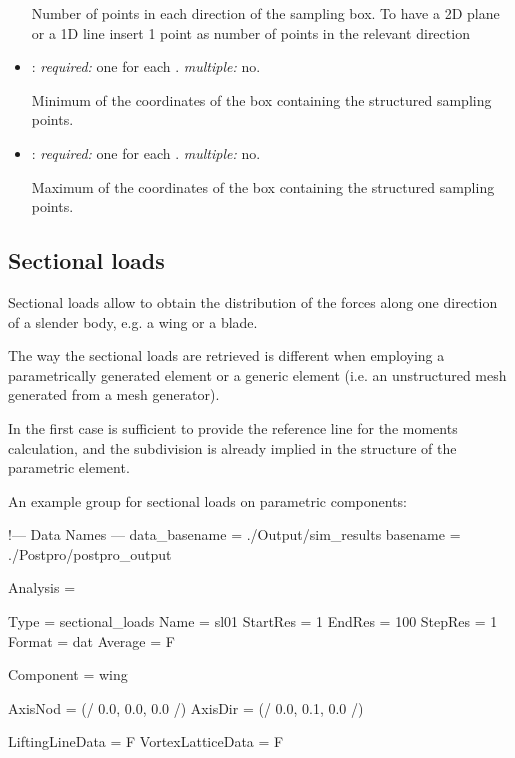 \begin{itemize}
Number of points in each direction of the sampling box. To have a 2D plane or a 1D line insert 1 point as number of points in the relevant direction

\item {}: \textit{required:} one for each . \textit{multiple:} no.

Minimum of the coordinates of the box containing the structured sampling points.

\item {}: \textit{required:} one for each . \textit{multiple:} no.

Maximum of the coordinates of the box containing the structured sampling points.

\end{itemize}

\subsection{Sectional loads}

Sectional loads allow to obtain the distribution of the forces along one direction of a slender body, e.g. a wing or a blade. 

The way the sectional loads are retrieved is different when employing a parametrically generated element or a generic element (i.e. an unstructured mesh generated from a mesh generator). 

In the first case is sufficient to provide the reference line for the moments calculation, and the subdivision is already implied in the structure of the parametric element. 

An example  group for sectional loads on parametric components:

\begin{inputfile}[frame=single, caption={dust\_post.in for sectional load on parametric components}, label={file:dust_post.in_sectional_param}]
!--- Data Names ---
data_basename = ./Output/sim_results
basename =     ./Postpro/postpro_output

Analysis = {

Type = sectional_loads
Name = sl01
StartRes = 1
EndRes   = 100 
StepRes  = 1
Format = dat
Average = F

Component = wing

AxisNod = (/ 0.0, 0.0, 0.0 /)
AxisDir = (/ 0.0, 0.1, 0.0 /)

LiftingLineData = F
VortexLatticeData = F
}
\end{inputfile}

